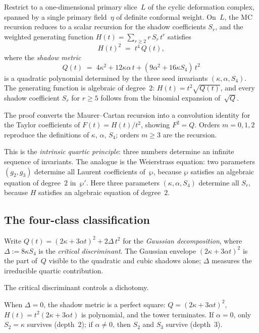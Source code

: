 \documentclass[11pt,reqno]{amsart}
\theoremstyle{definition}
\theoremstyle{remark}
\numberwithin{equation}{section}
\begin{document}
Restrict to a one-dimensional primary slice~$L$ of the
cyclic deformation complex, spanned by a single primary
field~$\eta$ of definite conformal weight. On~$L$, the
MC recursion reduces to a scalar recursion for the shadow
coefficients $S_r$, and the weighted generating function
$H(t) = \sum_{r \ge 2} r\,S_r\,t^r$ satisfies
\begin{equation}\label{eq:intro-algebraic}
 H(t)^2 \;=\; t^4\,Q(t),
\end{equation}
where the \emph{shadow metric}
\begin{equation}\label{eq:intro-shadow-metric}
 Q(t)
 \;=\;
 4\kappa^2 + 12\kappa\alpha\,t
 + (9\alpha^2 + 16\kappa S_4)\,t^2
\end{equation}
is a quadratic polynomial determined by the
three seed invariants $(\kappa, \alpha, S_4)$.
The generating function is algebraic of degree~$2$:
$H(t) = t^2 \sqrt{Q(t)}$, and every shadow coefficient $S_r$
for $r \ge 5$ follows from the binomial expansion of~$\sqrt{Q}$.

The proof converts the Maurer--Cartan recursion into a convolution
identity for the Taylor coefficients of $F(t) = H(t)/t^2$,
showing $F^2 = Q$. Orders $m = 0, 1, 2$ reproduce the definitions
of $\kappa$, $\alpha$, $S_4$; orders $m \ge 3$ are the recursion.

This is the \emph{intrinsic quartic principle}: three numbers
determine an infinite sequence of invariants. The analogue is the
Weierstrass equation: two parameters $(g_2, g_3)$ determine all
Laurent coefficients of~$\wp$, because $\wp$ satisfies an algebraic
equation of degree~$2$ in~$\wp'$. Here three parameters
$(\kappa, \alpha, S_4)$ determine all $S_r$, because $H$ satisfies
an algebraic equation of degree~$2$.

\subsection{The four-class classification}

Write
$Q(t) = (2\kappa + 3\alpha t)^2 + 2\Delta\,t^2$
for the \emph{Gaussian decomposition}, where
$\Delta := 8\kappa S_4$ is the \emph{critical discriminant}.
The Gaussian envelope $(2\kappa + 3\alpha t)^2$ is the part
of~$Q$ visible to the quadratic and cubic shadows alone;
$\Delta$ measures the irreducible quartic contribution.

The critical discriminant controls a dichotomy.

When $\Delta = 0$, the shadow metric is a perfect square:
$Q = (2\kappa + 3\alpha t)^2$, $H(t) = t^2(2\kappa + 3\alpha t)$
is polynomial, and the tower terminates. If $\alpha = 0$, only
$S_2 = \kappa$ survives (depth~$2$); if $\alpha \ne 0$, then
$S_2$ and $S_3$ survive (depth~$3$).
\end{document}
